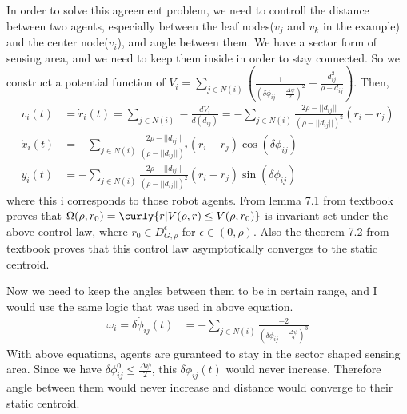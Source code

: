 \documentclass{article}
\begin{document}
\begin{problem}
    \vspace{12pt}
    In order to solve this agreement problem, we need to controll the distance between two agents, especially between the leaf nodes($v_j$ and $v_k$ in the example) and the center node($v_i$), and angle between them. We have a sector form of sensing area, and we need to keep them inside in order to stay connected. So we construct a potential function of $V_i = \sum_{j \in N(i) }(\frac{1}{(\delta \phi_{ij} - \frac{\Delta \psi}{2})^2} + \frac{d_{ij}^2}{\rho - d_{ij}})$. Then, 
    \begin{align*}
        v_i(t)&=\dot r_i(t) = \sum_{j \in N(i) }-\frac{dV_{i}}{d (d_{ij})}= -\sum_{j \in N(i) }\frac{2\rho  - ||d_{ij}||}{(\rho  - ||d_{ij} ||)^2} (r_{i} - r_{j} ) \\
        \dot x_i(t) &= -\sum_{j \in N(i) }\frac{2\rho  - ||d_{ij}||}{(\rho  - ||d_{ij} ||)^2} (r_{i} - r_{j} ) \cos(\delta \phi_{ij})\\
        \dot y_i(t) &= -\sum_{j \in N(i) }\frac{2\rho  - ||d_{ij}||}{(\rho  - ||d_{ij} ||)^2} (r_{i} - r_{j} ) \sin(\delta \phi_{ij})
    \end{align*}
    where this i corresponds to those robot agents. From lemma 7.1 from textbook proves that $\Omega (\rho, r_0) = \curly{r| V(\rho, r) \leq V(\rho, r_0)}$ is invariant set under the above control law, where $r_0 \in D_{G, \rho} ^\epsilon$ for $\epsilon \in (0, \rho)$. Also the theorem 7.2 from textbook proves that this control law asymptotically converges to the static centroid. 

    Now we need to keep the angles between them to be in certain range, and I would use the same logic that was used in above equation.
    \begin{align*}
        \omega_i = \dot {\delta \phi_{ij}}(t) &= - \sum_{j \in N(i) }\frac{-2}{( \delta \phi_{ij}-\frac{\Delta \psi}{2})^3} 
    \end{align*}
    With above equations, agents are guranteed to stay in the sector shaped sensing area. Since we have $\delta \phi_{ij}^0 \leq \frac{\Delta \psi}{2}$, this $\delta \phi_{ij}(t)$ would never increase. Therefore angle between them would never increase and distance would converge to their static centroid. 


\end{problem}
\end{document}
